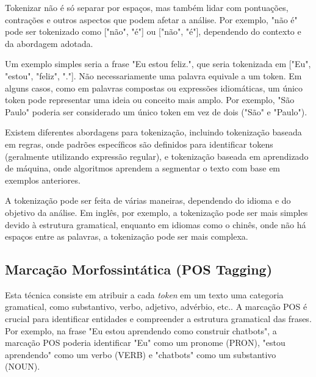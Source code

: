 \documentclass[14pt,a4paper,oneside]{book}
\begin{document}
Tokenizar não é só separar por espaços, mas também lidar com pontuações, contrações e outros aspectos que podem afetar a análise. Por exemplo, "não é" pode ser tokenizado como ["não", "é"] ou ["não", "é"], dependendo do contexto e da abordagem adotada. 

Um exemplo simples seria a frase "Eu estou feliz.", que seria tokenizada em ["Eu", "estou", "feliz", "."]. Não necessariamente uma palavra equivale a um token. Em alguns casos, como em palavras compostas ou expressões idiomáticas, um único token pode representar uma ideia ou conceito mais amplo. Por exemplo, "São Paulo" poderia ser considerado um único token em vez de dois ("São" e "Paulo"). 


Existem diferentes abordagens para tokenização, incluindo tokenização baseada em regras, onde padrões específicos são definidos para identificar tokens (geralmente utilizando expressão regular), e tokenização baseada em aprendizado de máquina, onde algoritmos aprendem a segmentar o texto com base em exemplos anteriores.

A tokenização pode ser feita de várias maneiras, dependendo do idioma e do objetivo da análise. Em inglês, por exemplo, a tokenização pode ser mais simples devido à estrutura gramatical, enquanto em idiomas como o chinês, onde não há espaços entre as palavras, a tokenização pode ser mais complexa.

\subsection{Marcação Morfossintática (POS Tagging)}

Esta técnica consiste em atribuir a cada \textit{token} em um texto uma categoria gramatical, como substantivo, verbo, adjetivo, advérbio, etc.. A marcação POS é crucial para identificar entidades e compreender a estrutura gramatical das frases. Por exemplo, na frase "Eu estou aprendendo como construir chatbots", a marcação POS poderia identificar "Eu" como um pronome (PRON), "estou aprendendo" como um verbo (VERB) e "chatbots" como um substantivo (NOUN).
\end{document}
